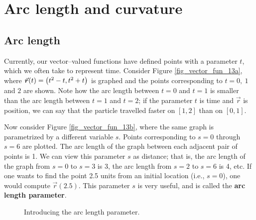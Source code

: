 \section{Arc length and curvature}\label{sec:curvature}
\subsection{Arc length}
Currently, our vector--valued functions have defined points with a parameter $t$, which we often take to represent time. Consider Figure \ref{fig_vector_fun_13a}, where $\vrt = \left( t^2-t,t^2+t\right)$ is graphed and the points corresponding to $t=0,\ 1$ and $2$ are shown. Note how the arc length between $t=0$ and $t=1$ is smaller than the arc length between $t=1$ and $t=2$; if the parameter $t$ is time and $\vec r$ is position, we can say that the particle travelled faster on $[1,2]$ than on $[0,1]$. 

Now consider Figure \ref{fig_vector_fun_13b}, where the same graph is parametrized by a different variable $s$.  Points corresponding to $s=0$ through $s=6$ are plotted. The arc length of the graph between each adjacent pair of points is 1. We can view this parameter $s$ as distance; that is, the arc length of the graph from $s=0$ to $s=3$ is 3, the arc length from $s=2$ to $s=6$ is 4, etc. If one wants to find the point 2.5 units from an initial location (i.e., $s=0$), one would compute $\vec r(2.5)$. This parameter $s$ is very useful, and is called the \textbf{arc length parameter}.


\begin{figure}[H]
\centering
\centerline{
\hspace{0.1cm}
}
\caption{Introducing the arc length parameter.}
\end{figure}


